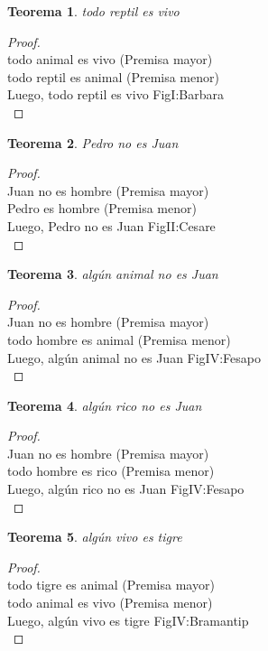 ﻿\documentclass[12pt]{book}
\newtheorem{theorem}{Teorema}[chapter]
\newtheorem{proof}{Demostración}
\begin{document}
\begin{theorem}
todo reptil es vivo
\label{th: 22}
\end{theorem}\begin{proof}\\todo animal es vivo	 (Premisa mayor) \\todo reptil es animal	 (Premisa menor) \\Luego, todo reptil es vivo	FigI:Barbara \\ \end{proof}
\begin{theorem}
Pedro no es Juan
\label{th: 23}
\end{theorem}\begin{proof}\\Juan no es hombre	 (Premisa mayor) \\Pedro es hombre	 (Premisa menor) \\Luego, Pedro no es Juan	FigII:Cesare \\ \end{proof}
\begin{theorem}
algún animal no es Juan
\label{th: 24}
\end{theorem}\begin{proof}\\Juan no es hombre	 (Premisa mayor) \\todo hombre es animal	 (Premisa menor) \\Luego, algún animal no es Juan	FigIV:Fesapo \\ \end{proof}
\begin{theorem}
algún rico no es Juan
\label{th: 25}
\end{theorem}\begin{proof}\\Juan no es hombre	 (Premisa mayor) \\todo hombre es rico	 (Premisa menor) \\Luego, algún rico no es Juan	FigIV:Fesapo \\ \end{proof}
\begin{theorem}
algún vivo es tigre
\label{th: 26}
\end{theorem}\begin{proof}\\todo tigre es animal	 (Premisa mayor) \\todo animal es vivo	 (Premisa menor) \\Luego, algún vivo es tigre	FigIV:Bramantip \\ \end{proof}
\end{document}

